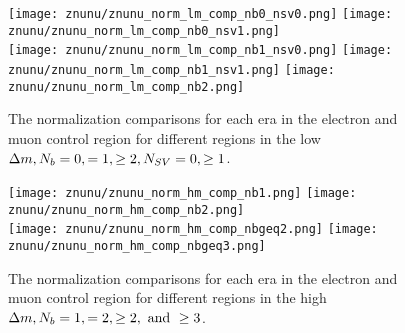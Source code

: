 \begin{figure}[!h]
	\begin{center}
  \texttt{[image: znunu/znunu\_norm\_lm\_comp\_nb0\_nsv0.png]}
  \texttt{[image: znunu/znunu\_norm\_lm\_comp\_nb0\_nsv1.png]} \\
  \texttt{[image: znunu/znunu\_norm\_lm\_comp\_nb1\_nsv0.png]}
  \texttt{[image: znunu/znunu\_norm\_lm\_comp\_nb1\_nsv1.png]} 
  \texttt{[image: znunu/znunu\_norm\_lm\_comp\_nb2.png]} \\

	\end{center}
	\caption[\Znunu{} Normalization Low \dm{} Comparisons]{The \Znunu{} normalization comparisons for each era in the electron and muon control region for different regions in the low $\Delta m, N_{b}=0,=1,\geq2, N_{SV}=0,\geq1$.
	 }
	\label{fig:znunu-norm-lm-comp}
\end{figure}

\begin{figure}[!h]
	\begin{center}
  \texttt{[image: znunu/znunu\_norm\_hm\_comp\_nb1.png]}
  \texttt{[image: znunu/znunu\_norm\_hm\_comp\_nb2.png]} \\
  \texttt{[image: znunu/znunu\_norm\_hm\_comp\_nbgeq2.png]}
  \texttt{[image: znunu/znunu\_norm\_hm\_comp\_nbgeq3.png]} \\
	\end{center}
	\caption[\Znunu{} Normalization High \dm{} Comparisons]{The \Znunu{} normalization comparisons for each era in the electron and muon control region for different regions in the high $\Delta m, N_{b}=1,=2,\geq2, \text{ and } \geq3$.
	 }
	\label{fig:znunu-norm-hm-comp}
\end{figure}